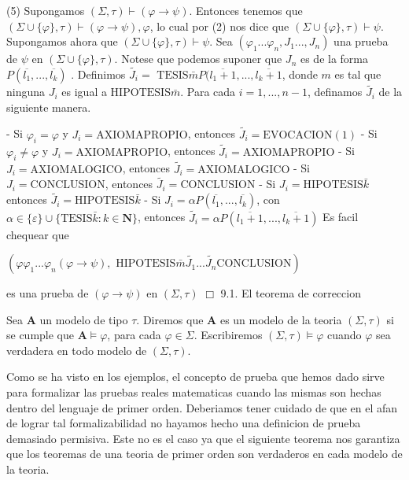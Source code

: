 (5) Supongamos \((\Sigma ,\tau )\vdash (\varphi \rightarrow \psi )\). Entonces tenemos que \((\Sigma \cup \{\varphi \},\tau )\vdash (\varphi \rightarrow \psi ),\varphi \), lo cual por (2) nos dice que \((\Sigma \cup \{\varphi \},\tau )\vdash \psi \). Supongamos ahora que \((\Sigma \cup \{\varphi \},\tau )\vdash \psi \). Sea \((\varphi _{1}...\varphi _{n},J_{1}...,J_{n})\) una prueba de \(\psi \) en \((\Sigma \cup \{\varphi \},\tau )\). Notese que podemos suponer que \(J_{n}\) es de la forma \(P(\overline{l_{1}},...,\overline{l_{k}})\) . Definimos \(\widetilde{J_{i}}=\) \(\mathrm{TESIS}\bar{m}P(\overline{l_{1}+1} ,...,\overline{l_{k}+1}\), donde \(m\) es tal que ninguna \(J_{i}\) es igual a \( \mathrm{HIPOTESIS}\bar{m}\). Para cada \(i=1,...,n-1\), definamos \(\widetilde{ J_{i}}\) de la siguiente manera.

- Si \(\varphi _{i}=\varphi \) y \(J_{i}=\mathrm{AXIOMAPROPIO}\), entonces \(\widetilde{J_{i}}=\mathrm{EVOCACION}(1)\)
- Si \(\varphi _{i}\neq \varphi \) y \(J_{i}=\mathrm{AXIOMAPROPIO}\), entonces \(\widetilde{J_{i}}=\mathrm{AXIOMAPROPIO}\)
- Si \(J_{i}=\mathrm{AXIOMALOGICO}\), entonces \(\widetilde{J_{i}}= \mathrm{AXIOMALOGICO}\)
- Si \(J_{i}=\mathrm{CONCLUSION}\), entonces \(\widetilde{J_{i}}=\mathrm{ CONCLUSION}\)
- Si \(J_{i}=\mathrm{HIPOTESIS}\bar{k}\) entonces \(\widetilde{J_{i}}= \mathrm{HIPOTESIS}\bar{k}\)
- Si \(J_{i}=\alpha P(\overline{l_{1}},...,\overline{l_{k}})\), con \( \alpha \in \{\varepsilon \}\cup \{\mathrm{TESIS}\bar{k}:k\in \mathbf{N}\}\), entonces \(\widetilde{J_{i}}=\alpha P(\overline{l_{1}+1},...,\overline{l_{k}+1 })\)
Es facil chequear que

\(\displaystyle (\varphi \varphi _{1}...\varphi _{n}(\varphi \rightarrow \psi ),\text{ HIPOTESIS}\bar{m}\widetilde{J_{1}}...\widetilde{J_{n}}\text{CONCLUSION}) \)

es una prueba de \((\varphi \rightarrow \psi )\) en \((\Sigma ,\tau )\) \(\Box\)
9.1. El teorema de correccion

Sea \(\mathbf{A}\) un modelo de tipo \(\tau .\) Diremos que \(\mathbf{A}\) es un modelo de la teoria \((\Sigma ,\tau )\) si se cumple que \(\mathbf{A} \models \varphi \), para cada \(\varphi \in \Sigma .\) Escribiremos \((\Sigma ,\tau )\models \varphi \) cuando \(\varphi \) sea verdadera en todo modelo de \( (\Sigma ,\tau )\).

Como se ha visto en los ejemplos, el concepto de prueba que hemos dado sirve para formalizar las pruebas reales matematicas cuando las mismas son hechas dentro del lenguaje de primer orden. Deberiamos tener cuidado de que en el afan de lograr tal formalizabilidad no hayamos hecho una definicion de prueba demasiado permisiva. Este no es el caso ya que el siguiente teorema nos garantiza que los teoremas de una teoria de primer orden son verdaderos en cada modelo de la teoria.

